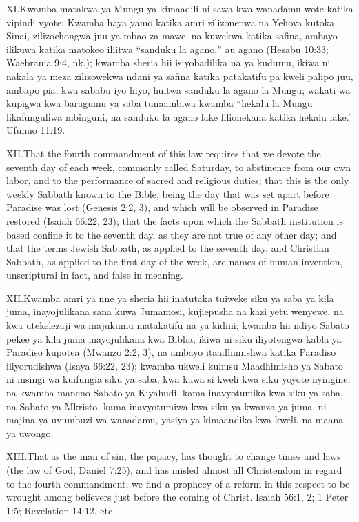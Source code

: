 \lettrine{XI.} Kwamba matakwa ya Mungu ya kimaadili ni sawa kwa wanadamu wote katika vipindi vyote; Kwamba haya yamo katika amri zilizonenwa na Yehova kutoka Sinai, zilizochongwa juu ya mbao za mawe, na kuwekwa katika safina, ambayo ilikuwa katika matokeo iliitwa “sanduku la agano,” au agano (Hesabu 10:33; Waebrania 9:4, nk.); kwamba sheria hii isiyobadilika na ya kudumu, ikiwa ni nakala ya meza zilizowekwa ndani ya safina katika patakatifu pa kweli palipo juu, ambapo pia, kwa sababu iyo hiyo, huitwa sanduku la agano la Mungu; wakati wa kupigwa kwa baragumu ya saba tunaambiwa kwamba “hekalu la Mungu likafunguliwa mbinguni, na sanduku la agano lake lilionekana katika hekalu lake.” Ufunuo 11:19.


\lettrine{XII.} That the fourth commandment of this law requires that we devote the seventh day of each week, commonly called Saturday, to abstinence from our own labor, and to the performance of sacred and religious duties; that this is the only weekly Sabbath known to the Bible, being the day that was set apart before Paradise was lost (Genesis 2:2, 3), and which will be observed in Paradise restored (Isaiah 66:22, 23); that the facts upon which the Sabbath institution is based confine it to the seventh day, as they are not true of any other day; and that the terms Jewish Sabbath, as applied to the seventh day, and Christian Sabbath, as applied to the first day of the week, are names of human invention, unscriptural in fact, and false in meaning.


\lettrine{XII.} Kwamba amri ya nne ya sheria hii inatutaka tuiweke siku ya saba ya kila juma, inayojulikana sana kuwa Jumamosi, kujiepusha na kazi yetu wenyewe, na kwa utekelezaji wa majukumu matakatifu na ya kidini; kwamba hii ndiyo Sabato pekee ya kila juma inayojulikana kwa Biblia, ikiwa ni siku iliyotengwa kabla ya Paradiso kupotea (Mwanzo 2:2, 3), na ambayo itaadhimishwa katika Paradiso iliyorudishwa (Isaya 66:22, 23); kwamba ukweli kuhusu Maadhimisho ya Sabato ni msingi wa kuifungia siku ya saba, kwa kuwa si kweli kwa siku yoyote nyingine; na kwamba maneno Sabato ya Kiyahudi, kama inavyotumika kwa siku ya saba, na Sabato ya Mkristo, kama inavyotumiwa kwa siku ya kwanza ya juma, ni majina ya uvumbuzi wa wanadamu, yasiyo ya kimaandiko kwa kweli, na maana ya uwongo.


\lettrine{XIII.} That as the man of sin, the papacy, has thought to change times and laws (the law of God, Daniel 7:25), and has misled almost all Christendom in regard to the fourth commandment, we find a prophecy of a reform in this respect to be wrought among believers just before the coming of Christ. Isaiah 56:1, 2; 1 Peter 1:5; Revelation 14:12, etc.


